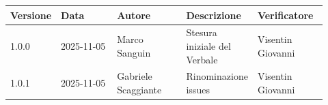 \documentclass[a4paper,12pt]{article}
\begin{document}
	\begin{center}
		\small
		\renewcommand{\arraystretch}{1.2} 
		\begin{tabular}{|p{0.1\linewidth}|p{0.18\linewidth}|p{0.22\linewidth}|p{0.20\linewidth}|p{0.22\linewidth}|}
			\hline
			\rowcolor{gray!60} 
			\textbf{Versione} & \textbf{Data} & \textbf{Autore} & \textbf{Descrizione} & \textbf{Verificatore} \\
			\hline
			\rowcolor{white}
			1.0.0 & 2025-11-05 & Marco Sanguin  & Stesura iniziale del Verbale & Visentin Giovanni \\
			\hline
			\rowcolor{gray!20} 
			1.0.1 & 2025-11-05 & Gabriele Scaggiante & Rinominazione issues & Visentin Giovanni \\
			\hline
	
		\end{tabular}
	\end{center}
	
\end{document}
